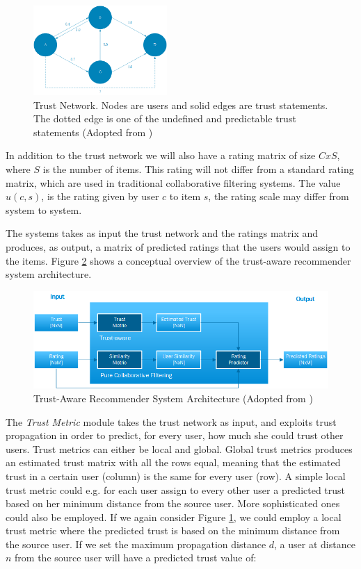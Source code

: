 \begin{figure}[H]
    \includegraphics[width=2in]{image/webofTrust.png}
    \centering
    \caption[Trust Network]{Trust Network. Nodes are users and solid edges are trust statements. The dotted edge is one of the undefined and predictable trust statements (Adopted from \cite{Massa2004})}
    \label{figure:weboftrust}
\end{figure}

In addition to the trust network we will also have a rating matrix of size
$CxS$, where $S$ is the number of items. This rating will not differ from a
standard rating matrix, which are used in traditional collaborative filtering
systems. The value $u(c,s)$, is the rating given by user $c$ to item $s$, the
rating scale may differ from system to system.

The systems takes as input the trust network and the ratings matrix and
produces, as output, a matrix of predicted ratings that the users would assign
to the items. Figure \ref{figure:trustarchictecture} shows a conceptual
overview of the trust-aware recommender system architecture.

\begin{figure}[H]
    \includegraphics[width=5in]{image/trustawarearchitecture.png}
    \centering
    \caption[Trust-Aware Recommender System Architecture]{Trust-Aware
    Recommender System Architecture (Adopted from \cite{Massa2004})}
    \label{figure:trustarchictecture}
\end{figure}

The \emph{Trust Metric} module takes the trust network as input, and exploits
trust propagation in order to predict, for every user, how much she could trust
other users. Trust metrics can either be local and global. Global trust metrics
produces an estimated trust matrix with all the rows equal, meaning that the
estimated trust in a certain user (column) is the same for every user (row). A
simple local trust metric could e.g. for each user assign to every other user a
predicted trust based on her minimum distance from the source user. More
sophisticated ones could also be employed. If we again consider Figure
\ref{figure:weboftrust}, we could employ a local trust metric where the
predicted trust is based on the minimum distance from the source user. If we
set the maximum propagation distance $d$, a user at distance $n$ from the
source user will have a predicted trust value of:

